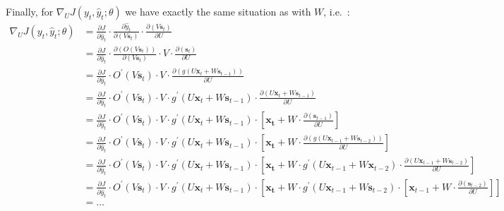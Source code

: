 Finally, for $\nabla_U J(y_t, \hat{y}_t ; \theta)$ we have exactly the same situation as with $W$, i.e.\ :
\begingroup
\allowdisplaybreaks
{\setlength{\jot}{5pt}
\begin{align*}
\nabla_U J(y_t, \hat{y}_t ; \theta)& = \frac{\partial J}{\partial \hat{y}_t}
\cdot \frac{\partial \hat{y}_t}{\partial (V \boldsymbol{s}_{t})} \cdot \frac{\partial (V \boldsymbol{s}_{t})}{\partial
U} \\
&= \frac{\partial J}{\partial \hat{y}_t} \cdot \frac{ \partial ( O(V\boldsymbol{s}_{t}))}{\partial
(V\boldsymbol{s}_{t})}
\cdot V \cdot \frac{\partial (\boldsymbol{s}_{t})}{\partial U} \\
&= \frac{\partial J}{\partial \hat{y}_t} \cdot O^\prime(V \boldsymbol{s}_{t}) \cdot V
\cdot \frac{\partial (g(U \boldsymbol{x}_{t} + W \boldsymbol{s}_{t-1}))} {\partial U} \\
&= \frac{\partial J}{\partial \hat{y}_t} \cdot O^\prime(V \boldsymbol{s}_{t}) \cdot V
\cdot g^\prime(U \boldsymbol{x}_{t} + W \boldsymbol{s}_{t-1})
\cdot \frac{\partial (U \boldsymbol{x}_{t} + W \boldsymbol{s}_{t-1})} {\partial U} \\
& = \frac{\partial J}{\partial \hat{y}_t} \cdot O^\prime(V \boldsymbol{s}_{t}) \cdot V \cdot g^\prime(U
\boldsymbol{x}_{t}
+ W \boldsymbol{s}_{t-1}) \cdot \left[\boldsymbol{x_{t}}
+ W \cdot \frac{\partial(\boldsymbol{s}_{t-1})} {\partial U} \right] \\
& = \frac{\partial J}{\partial \hat{y}_t} \cdot O^\prime(V \boldsymbol{s}_{t}) \cdot V \cdot g^\prime(U
\boldsymbol{x}_{t}
+ W \boldsymbol{s}_{t-1}) \cdot \left[\boldsymbol{x_{t}} + W \cdot \frac{\partial (g(U\boldsymbol{x}_{t-1}
+ W \boldsymbol{s}_{t-2}))} {\partial U}\right] \\
& = \frac{\partial J}{\partial \hat{y}_t} \cdot O^\prime(V\boldsymbol{s}_{t}) \cdot V \cdot g^\prime(U\boldsymbol{x}_{t}
+ W \boldsymbol{s}_{t-1}) \cdot \left[\boldsymbol{x_{t}} + W \cdot g^\prime (U\boldsymbol{x}_{t-1}
+ W \boldsymbol{x}_{t-2}) \cdot \frac{\partial(U \boldsymbol{x}_{t-1} + W\boldsymbol{s}_{t-2})} {\partial U} \right] \\
&= \frac{\partial J}{\partial \hat{y}_t} \cdot O^\prime(V\boldsymbol{s}_{t}) \cdot V \cdot g^\prime(U\boldsymbol{x}_{t}
+ W \boldsymbol{s}_{t-1}) \cdot \left[\boldsymbol{x_{t}} + W \cdot g^\prime (U\boldsymbol{x}_{t-1}
+ W \boldsymbol{s}_{t-2}) \cdot \left[\boldsymbol{x}_{t-1}
+ W \cdot \frac{\partial(\boldsymbol{s}_{t-2})} {\partial U} \right] \right] \\
& = \ldots
\end{align*}}
\endgroup

